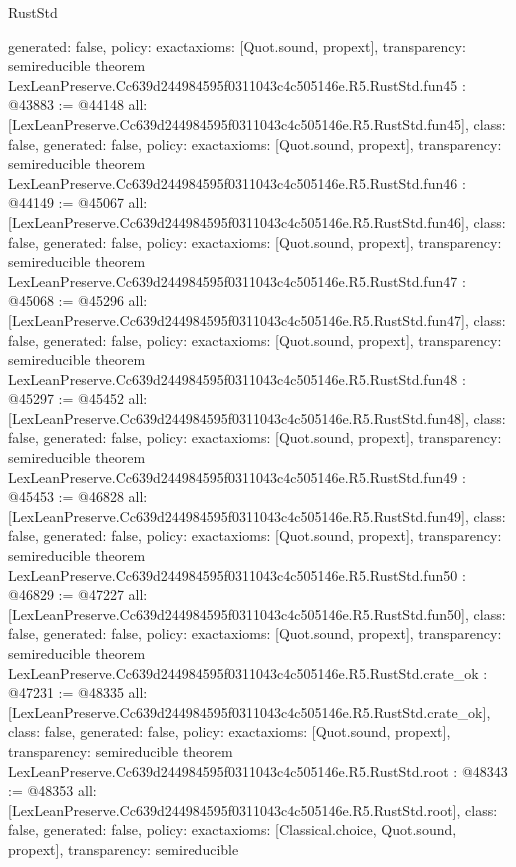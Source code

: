 \begin{lexlean}{RustStd}
\begin{coremodule}
{  generated: false,
  policy: exact{axioms: [Quot.sound, propext]},
  transparency: semireducible
}
theorem LexLeanPreserve.Cc639d244984595f0311043c4c505146e.R5.RustStd.fun45 : @43883 := @44148 {
  all: [LexLeanPreserve.Cc639d244984595f0311043c4c505146e.R5.RustStd.fun45],
  class: false,
  generated: false,
  policy: exact{axioms: [Quot.sound, propext]},
  transparency: semireducible
}
theorem LexLeanPreserve.Cc639d244984595f0311043c4c505146e.R5.RustStd.fun46 : @44149 := @45067 {
  all: [LexLeanPreserve.Cc639d244984595f0311043c4c505146e.R5.RustStd.fun46],
  class: false,
  generated: false,
  policy: exact{axioms: [Quot.sound, propext]},
  transparency: semireducible
}
theorem LexLeanPreserve.Cc639d244984595f0311043c4c505146e.R5.RustStd.fun47 : @45068 := @45296 {
  all: [LexLeanPreserve.Cc639d244984595f0311043c4c505146e.R5.RustStd.fun47],
  class: false,
  generated: false,
  policy: exact{axioms: [Quot.sound, propext]},
  transparency: semireducible
}
theorem LexLeanPreserve.Cc639d244984595f0311043c4c505146e.R5.RustStd.fun48 : @45297 := @45452 {
  all: [LexLeanPreserve.Cc639d244984595f0311043c4c505146e.R5.RustStd.fun48],
  class: false,
  generated: false,
  policy: exact{axioms: [Quot.sound, propext]},
  transparency: semireducible
}
theorem LexLeanPreserve.Cc639d244984595f0311043c4c505146e.R5.RustStd.fun49 : @45453 := @46828 {
  all: [LexLeanPreserve.Cc639d244984595f0311043c4c505146e.R5.RustStd.fun49],
  class: false,
  generated: false,
  policy: exact{axioms: [Quot.sound, propext]},
  transparency: semireducible
}
theorem LexLeanPreserve.Cc639d244984595f0311043c4c505146e.R5.RustStd.fun50 : @46829 := @47227 {
  all: [LexLeanPreserve.Cc639d244984595f0311043c4c505146e.R5.RustStd.fun50],
  class: false,
  generated: false,
  policy: exact{axioms: [Quot.sound, propext]},
  transparency: semireducible
}
theorem LexLeanPreserve.Cc639d244984595f0311043c4c505146e.R5.RustStd.crate_ok : @47231 := @48335 {
  all: [LexLeanPreserve.Cc639d244984595f0311043c4c505146e.R5.RustStd.crate_ok],
  class: false,
  generated: false,
  policy: exact{axioms: [Quot.sound, propext]},
  transparency: semireducible
}
theorem LexLeanPreserve.Cc639d244984595f0311043c4c505146e.R5.RustStd.root : @48343 := @48353 {
  all: [LexLeanPreserve.Cc639d244984595f0311043c4c505146e.R5.RustStd.root],
  class: false,
  generated: false,
  policy: exact{axioms: [Classical.choice, Quot.sound, propext]},
  transparency: semireducible
}


\end{coremodule}
\end{lexlean}
